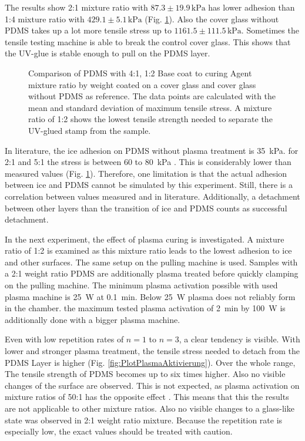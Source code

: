 The results show 2:1 mixture ratio with $87.3\pm19.9\,\si{\kilo\pascal}$ has lower adhesion than 1:4 mixture ratio with $429.1\pm5.1\,\si{\kilo\pascal}$ (Fig. \ref{fig:vgl4:1zu1:2zuGlas}). Also the cover glass without PDMS takes up a lot more tensile stress up to $1161.5\pm111.5\,\si{\kilo\pascal}$. Sometimes the tensile testing machine is able to break the control cover glass. This shows that the UV-glue is stable enough to pull on the PDMS layer.


\begin{figure}[hbt!]
	\centering	
	
	\caption{Comparison of PDMS with 4:1, 1:2 Base coat to curing Agent mixture ratio by weight coated on a cover glass and cover glass without PDMS as reference. The data points are calculated with the mean and standard deviation of maximum tensile stress. A mixture ratio of 1:2 shows the lowest tensile strength needed to separate the UV-glued stamp from the sample.}
	\label{fig:vgl4:1zu1:2zuGlas}
\end{figure}


In literature, the ice adhesion on PDMS without plasma treatment is \SI{35}{\kilo\pascal}. for 2:1 and 5:1 the stress is between $60$ to \SI{80}{\kilo\pascal} \cite{IbanezIbanez.2022}. This is considerably lower than measured values (Fig. \ref{fig:vgl4:1zu1:2zuGlas}). Therefore, one limitation is that the actual adhesion between ice and PDMS cannot be simulated by this experiment. Still, there is a correlation between values measured and in literature. Additionally, a detachment between other layers than the transition of ice and PDMS counts as successful detachment. 

In the next experiment, the effect of plasma curing is investigated. A mixture ratio of 1:2 is examined as this mixture ratio leads to the lowest adhesion to ice and other surfaces. The same setup on the pulling machine is used. Samples with a 2:1 weight ratio PDMS are additionally plasma treated before quickly clamping on the pulling machine. The minimum plasma activation possible with used plasma machine is 
\SI{25}{\watt} at \SI{0.1}{\minute}. Below \SI{25}{\watt} plasma does not reliably form in the chamber. the maximum tested plasma activation of \SI{2}{\minute} by \SI{100}{\watt} is additionally done with a bigger plasma machine.

Even with low repetition rates of $n=1$ to $n=3$, a clear tendency is visible. With lower and stronger plasma treatment, the tensile stress needed to detach from the PDMS Layer is higher (Fig. \ref{fig:PlotPlasmaAktivierung}). Over the whole range, The tensile strength of PDMS becomes up to six times higher. Also no visible changes of the surface are observed. This is not expected, as plasma activation on mixture ratios of 50:1 has the opposite effect \cite{Ohishi.2017}. This means that this the results are not applicable to other mixture ratios. Also no visible changes to a glass-like state was observed in 2:1 weight ratio mixture. Because the repetition rate is especially low, the exact values should be treated with caution. 

